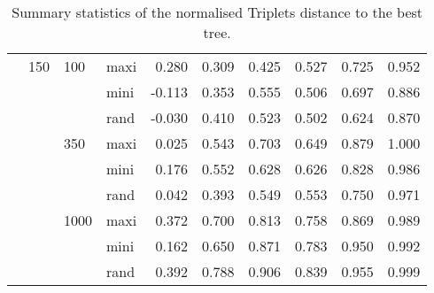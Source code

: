 \begin{table}[ht]
\begin{tabular}{llllrrrrrr}
   & 150 & 100 & maxi & 0.280 & 0.309 & 0.425 & 0.527 & 0.725 & 0.952 \\ 
   &  &  & mini & -0.113 & 0.353 & 0.555 & 0.506 & 0.697 & 0.886 \\ 
   &  &  & rand & -0.030 & 0.410 & 0.523 & 0.502 & 0.624 & 0.870 \\ 
   &  & 350 & maxi & 0.025 & 0.543 & 0.703 & 0.649 & 0.879 & 1.000 \\ 
   &  &  & mini & 0.176 & 0.552 & 0.628 & 0.626 & 0.828 & 0.986 \\ 
   &  &  & rand & 0.042 & 0.393 & 0.549 & 0.553 & 0.750 & 0.971 \\ 
   &  & 1000 & maxi & 0.372 & 0.700 & 0.813 & 0.758 & 0.869 & 0.989 \\ 
   &  &  & mini & 0.162 & 0.650 & 0.871 & 0.783 & 0.950 & 0.992 \\ 
   &  &  & rand & 0.392 & 0.788 & 0.906 & 0.839 & 0.955 & 0.999 \\ 
   \hline
\end{tabular}
\caption{Summary statistics of the normalised Triplets distance to the best tree.} 
\label{Tab_SummaryTrbest}
\end{table}
